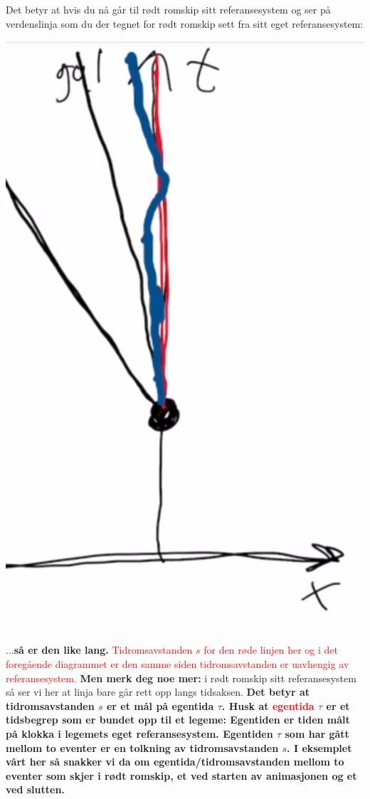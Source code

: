 \documentclass{beamer}
\newcommand{\pagebutton}[1]{\setbeamertemplate{button}{\tikz\node[inner xsep = 5pt, draw = structure!90, fill = green(ryb), rounded corners = 8pt]{\color{amber}\Large\insertbuttontext};}\beamerbutton{#1}}
\begin{document}
\begin{frame}
{
Det betyr at hvis du nå går til rødt romskip sitt referansesystem og ser på verdenslinja som du der tegnet for rødt romskip sett fra sitt eget referansesystem:\\
\centerline{\includegraphics[scale=0.13]{media/romskipene2.png}}
...{\bf så er den like lang.} \textcolor{red}{Tidromsavstanden $s$ for den røde linjen her og i det foregående diagrammet er den samme siden tidromsavstanden er uavhengig av referansesystem.} {\bf Men merk deg noe mer:} i rødt romskip sitt referansesystem så ser vi her at linja bare går rett opp langs tidsaksen. {\bf Det betyr at tidromsavstanden $s$ er et mål på egentida $\tau$. Husk at \textcolor{red}{egentida $\tau$} er et tidsbegrep som er bundet opp til et legeme: Egentiden er tiden målt på klokka i legemets eget referansesystem. Egentiden $\tau$ som har gått mellom to eventer er en tolkning av tidromsavstanden $s$. I eksemplet vårt her så snakker vi da om egentida/tidromsavstanden mellom to eventer som skjer i rødt romskip, et ved starten av animasjonen og et ved slutten.}
\hyperlink{td19b}{\pagebutton{SIDE 27/38/44}}}


\end{frame}
\end{document}
